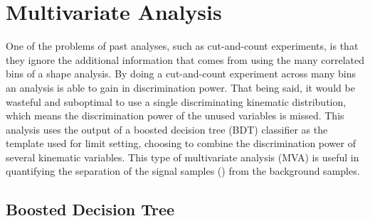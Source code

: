 \section{Multivariate Analysis}

One of the problems of past analyses, such as cut-and-count experiments, is that they ignore the additional information that comes from using the many correlated bins of a shape analysis.
By doing a cut-and-count experiment across many bins an analysis is able to gain in discrimination power.
That being said, it would be wasteful and suboptimal to use a single discriminating kinematic distribution, which means the discrimination power of the unused variables is missed.
This analysis uses the output of a boosted decision tree (BDT) classifier as the template used for limit setting, choosing to combine the discrimination power of several kinematic variables.
This type of multivariate analysis (MVA) is useful in quantifying the separation of the signal samples (\HWW) from the background samples.

\subsection{Boosted Decision Tree}

